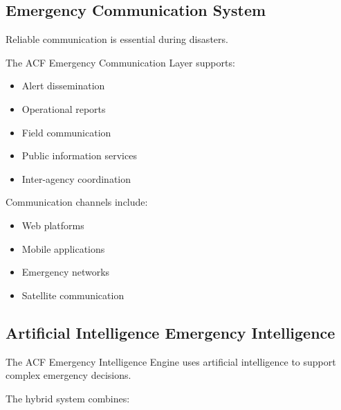
\subsection{Emergency Communication System}

Reliable communication is essential during disasters.

The ACF Emergency Communication Layer supports:

\begin{itemize}

\item Alert dissemination

\item Operational reports

\item Field communication

\item Public information services

\item Inter-agency coordination

\end{itemize}


Communication channels include:

\begin{itemize}

\item Web platforms

\item Mobile applications

\item Emergency networks

\item Satellite communication

\end{itemize}


\subsection{Artificial Intelligence Emergency Intelligence}

The ACF Emergency Intelligence Engine uses artificial intelligence to
support complex emergency decisions.

The hybrid system combines:

